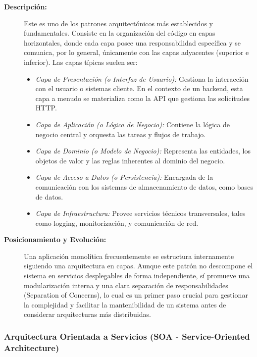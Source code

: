 \begin{description}
    \item[\textbf{Descripción:}] Este es uno de los patrones arquitectónicos más establecidos y fundamentales. Consiste en la organización del código en capas horizontales, donde cada capa posee una responsabilidad específica y se comunica, por lo general, únicamente con las capas adyacentes (superior e inferior). Las capas típicas suelen ser:
    \begin{itemize}
        \item \textit{Capa de Presentación (o Interfaz de Usuario):} Gestiona la interacción con el usuario o sistemas cliente. En el contexto de un backend, esta capa a menudo se materializa como la API que gestiona las solicitudes HTTP.
        \item \textit{Capa de Aplicación (o Lógica de Negocio):} Contiene la lógica de negocio central y orquesta las tareas y flujos de trabajo.
        \item \textit{Capa de Dominio (o Modelo de Negocio):} Representa las entidades, los objetos de valor y las reglas inherentes al dominio del negocio.
        \item \textit{Capa de Acceso a Datos (o Persistencia):} Encargada de la comunicación con los sistemas de almacenamiento de datos, como bases de datos.
        \item \textit{Capa de Infraestructura:} Provee servicios técnicos transversales, tales como logging, monitorización, y comunicación de red.
    \end{itemize}
    \item[\textbf{Posicionamiento y Evolución:}] Una aplicación monolítica frecuentemente se estructura internamente siguiendo una arquitectura en capas. Aunque este patrón no descompone el sistema en servicios desplegables de forma independiente, sí promueve una modularización interna y una clara separación de responsabilidades (Separation of Concerns), lo cual es un primer paso crucial para gestionar la complejidad y facilitar la mantenibilidad de un sistema antes de considerar arquitecturas más distribuidas.
\end{description}

\subsubsection*{Arquitectura Orientada a Servicios (SOA - Service-Oriented Architecture) \cite{soa_ibm}}

